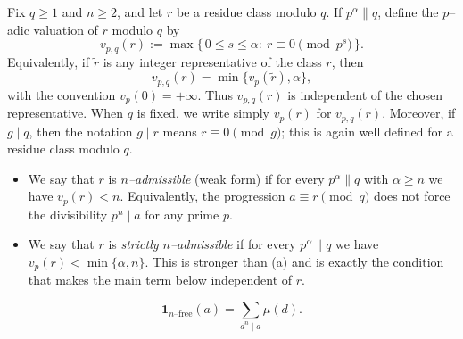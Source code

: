 \documentclass[10pt,a4paper]{amsart}
\begin{document}
\begin{definition}\label{def:admissibilities}
Fix $q\ge1$ and $n\ge2$, and let $r$ be a residue class modulo $q$.  If
$p^\alpha\parallel q$, define the $p$--adic valuation of $r$ modulo $q$ by
\[
 v_{p,q}(r):=\max\{\,0\le s\le \alpha:\ r\equiv0\pmod{p^s}\,\}.
\]
Equivalently, if $\widetilde r$ is any integer representative of the class $r$, then
\[
 v_{p,q}(r)=\min\{v_p(\widetilde r),\alpha\},
\]
with the convention $v_p(0)=+\infty$.  Thus $v_{p,q}(r)$ is independent of the chosen
representative.  When $q$ is fixed, we write simply $v_p(r)$ for $v_{p,q}(r)$.
Moreover, if $g\mid q$, then the notation $g\mid r$ means $r\equiv0\pmod g$; this is again
well defined for a residue class modulo $q$.
\begin{itemize}
\item[(a)] We say that $r$ is \emph{$n$--admissible} (weak form) if for every
$p^\alpha\parallel q$ with $\alpha\ge n$ we have $v_p(r)<n$.  Equivalently, the progression
$a\equiv r\pmod q$ does not force the divisibility $p^n\mid a$ for any prime $p$.
\item[(b)] We say that $r$ is \emph{strictly $n$--admissible} if for every $p^\alpha\parallel q$
we have $v_p(r)<\min\{\alpha,n\}$.  This is stronger than (a) and is exactly the condition
that makes the main term below independent of $r$.
\end{itemize}
\end{definition}

\begin{equation}\label{eq:mobius-nfree}
\mathbf 1_{\text{$n$--free}}(a)=\sum_{d^n\mid a}\mu(d).
\end{equation}
\end{document}
